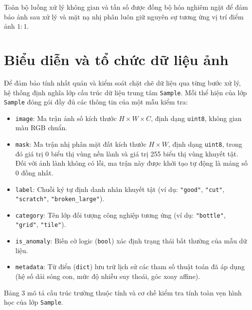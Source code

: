 Toàn bộ luồng xử lý không gian và tần số được đồng bộ hóa nghiêm ngặt để đảm bảo ảnh sau xử lý và mặt nạ nhị phân luôn giữ nguyên sự tương ứng vị trí điểm ảnh $1:1$.

\section{Biểu diễn và tổ chức dữ liệu ảnh}

Để đảm bảo tính nhất quán và kiểm soát chặt chẽ dữ liệu qua từng bước xử lý, hệ thống định nghĩa lớp cấu trúc dữ liệu trung tâm \texttt{Sample}. Mỗi thể hiện của lớp \texttt{Sample} đóng gói đầy đủ các thông tin của một mẫu kiểm tra:
\begin{itemize}
    \item \texttt{image}: Ma trận ảnh số kích thước $H \times W \times C$, định dạng \texttt{uint8}, không gian màu RGB chuẩn.
    \item \texttt{mask}: Ma trận nhị phân mặt đất kích thước $H \times W$, định dạng \texttt{uint8}, trong đó giá trị 0 biểu thị vùng nền lành và giá trị 255 biểu thị vùng khuyết tật. Đối với ảnh lành không có lỗi, ma trận này được khởi tạo tự động là mảng số 0 đồng nhất.
    \item \texttt{label}: Chuỗi ký tự định danh nhãn khuyết tật (ví dụ: \texttt{"good"}, \texttt{"cut"}, \texttt{"scratch"}, \texttt{"broken\_large"}).
    \item \texttt{category}: Tên lớp đối tượng công nghiệp tương ứng (ví dụ: \texttt{"bottle"}, \texttt{"grid"}, \texttt{"tile"}).
    \item \texttt{is\_anomaly}: Biến cờ logic (\texttt{bool}) xác định trạng thái bất thường của mẫu dữ liệu.
    \item \texttt{metadata}: Từ điển (\texttt{dict}) lưu trữ lịch sử các tham số thuật toán đã áp dụng (hệ số dải sóng con, mức độ nhiễu suy thoái, góc xoay affine).
\end{itemize}

Bảng 3 mô tả cấu trúc trường thuộc tính và cơ chế kiểm tra tính toàn vẹn hình học của lớp \texttt{Sample}.

